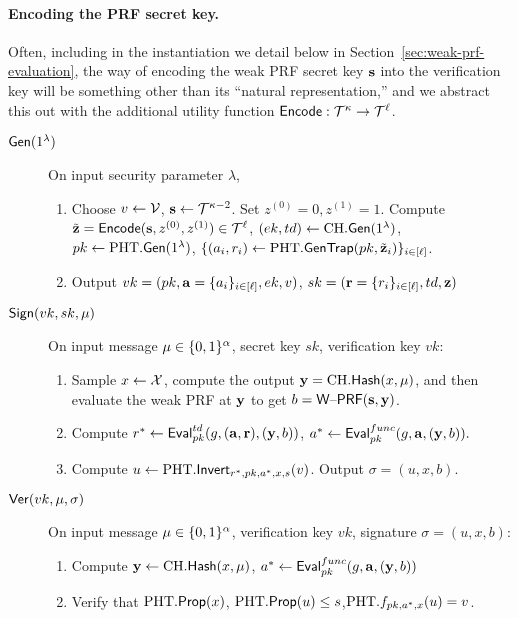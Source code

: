 \paragraph{Encoding the PRF secret key.}\label{sec:prf-sec-encoding}
Often, including in the instantiation we detail below in Section~\ref{sec:weak-prf-evaluation}, the
way of encoding the weak PRF secret key $\mathbf{s}$ into the verification key
will be something other than its ``natural representation,'' and we
abstract this out with the additional utility function $\mathsf{Encode}:\mathcal{T}^{\kappa} \to \mathcal{T}^{\ell}$.



\begin{description}
\item[$\mathsf{Gen}(1^{\lambda})$] On input security parameter $\lambda$,
\begin{enumerate}
\item Choose $v \gets \mathcal{V}$, $\mathbf{s}\gets
  \mathcal{T}^{\kappa-2}$. Set $z^{(0)}=0,z^{(1)}=1$. Compute $\tilde{\mathbf{z}}
  = \mathsf{Encode}(\mathbf{s}, z^{(0)}, z^{(1)}) \in \mathcal{T}^{\ell}$, $(ek,td) \gets \text{CH}.\mathsf{Gen}(1^{\lambda})$, $pk \gets \text{PHT}.\mathsf{Gen}(1^{\lambda})$, $\{(a_i, r_i) \gets \text{PHT}.\mathsf{GenTrap}(pk,\tilde{\mathbf{z}}_i)\}_{i \in [\ell]}$.
\item Output $vk=(pk,\mathbf{a}=\{a_i\}_{i \in [\ell]},ek,v)$, $sk=(\mathbf{r}=\{r_i\}_{i \in [\ell]},td,\mathbf{z})$
\end{enumerate}
\item[$\mathsf{Sign}(vk,sk,\mu)$] On input message $\mu \in \{0,1\}^{\alpha}$, secret key $sk$,
  verification key $vk$:
\begin{enumerate}
\item Sample  $x
  \gets \mathcal{X}$, compute the output $\mathbf{y}=\text{CH}.\mathsf{Hash}(x,\mu)$, and
  then evaluate the weak PRF at $\mathbf{y}$ to get $b=\mathsf{W\text{\textendash}PRF}(\mathbf{s},\mathbf{y})$.
\item Compute $r^* \gets \mathsf{Eval}_{pk}^{td}(g, (\mathbf{a},\mathbf{r}),(\mathbf{y},b))$, $a^* \gets \mathsf{Eval}_{pk}^{func}(g,\mathbf{a},(\mathbf{y},b)).$
\item 
Compute $u \gets \text{PHT}.\mathsf{Invert}_{r^*,pk,a^*,x,s}(v)$. Output
  $\sigma=(u,x,b)$.
\end{enumerate}
\item[$\mathsf{Ver}(vk,\mu,\sigma)$] On input message $\mu \in \{0,1\}^{\alpha}$,
  verification key $vk$, signature $\sigma=(u,x,b)$:
\begin{enumerate}
\item Compute $\mathbf{y} \gets \text{CH}.\mathsf{Hash}(x,\mu)$, $a^* \gets \mathsf{Eval}_{pk}^{func}(g,\mathbf{a},(\mathbf{y},b))$
\item 
Verify that $\text{PHT}.\mathsf{Prop}(x)$,
$\text{PHT}.\mathsf{Prop}(u) \leq s$,$\text{PHT}.f_{pk,a^*,x}(u)=v$.
\end{enumerate}
\end{description}


